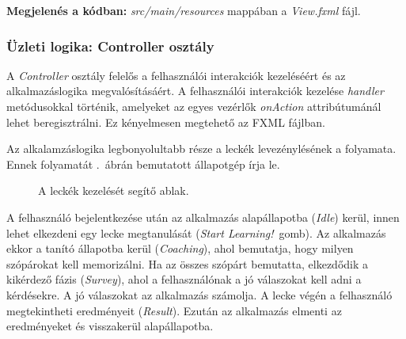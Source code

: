 \documentclass[11pt, a4paper]{article}
\begin{document}
 	\vspace{3mm}
 	\textbf{Megjelenés a kódban:} \textit{src/main/resources} mappában a \textit{View.fxml} fájl.
   
     \subsubsection{Üzleti logika: Controller osztály}
     A \textsl{Controller} osztály felelős a felhasználói interakciók kezeléséért és az alkalmazáslogika megvalósításáért. A felhasználói interakciók kezelése \emph{handler} metódusokkal történik, amelyeket az egyes vezérlők \emph{onAction} attribútumánál lehet beregisztrálni. Ez kényelmesen megtehető az FXML fájlban.
     
     Az alkalamzáslogika legbonyolultabb része a leckék levezénylésének a folyamata. Ennek folyamatát .~ábrán bemutatott állapotgép írja le.
     \begin{figure}[h!]
     	\center
     	\caption{A leckék kezelését segítő ablak.}
     	\label{fig:business-logic}
     \end{figure}
 
 	A felhasználó bejelentkezése után az alkalmazás alapállapotba (\emph{Idle}) kerül, innen lehet elkezdeni egy lecke megtanulását (\emph{Start Learning!}~gomb). Az alkalmazás ekkor a tanító állapotba kerül (\emph{Coaching}), ahol bemutatja, hogy milyen szópárokat kell memorizálni. Ha az összes szópárt bemutatta, elkezdődik a kikérdező fázis (\emph{Survey}), ahol a felhasználónak a jó válaszokat kell adni a kérdésekre. A jó válaszokat az alkalmazás számolja. A lecke végén a felhasználó megtekintheti eredményeit (\emph{Result}). Ezután az alkalmazás elmenti az eredményeket és visszakerül alapállapotba.
     
\end{document}
